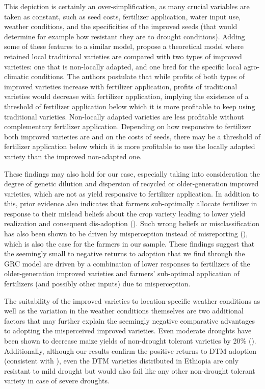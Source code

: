 \documentclass[11pt]{article}
\begin{document}
This depiction is certainly an over-simplification, as many crucial variables are taken as constant, such as seed costs, fertilizer application, water input use, weather conditions, and the specificities of the improved seeds (that would determine for example how resistant they are to drought conditions). Adding some of these features to a similar model, \cite{Bird2020-nt} propose a theoretical model where retained local traditional varieties are compared with two types of improved varieties: one that is non-locally adapted, and one bred for the specific local agro-climatic conditions. The authors postulate that while profits of both types of improved varieties increase with fertilizer application, profits of traditional varieties would decrease with fertilizer application, implying the existence of a threshold of fertilizer application below which it is more profitable to keep using traditional varieties. Non-locally adapted varieties are less profitable without complementary fertilizer application. Depending on how responsive to fertilizer both improved varieties are and on the costs of seeds, there may be a threshold of fertilizer application below which it is more profitable to use the locally adapted variety than the improved non-adapted one.

These findings may also hold for our case, especially taking into consideration the degree of genetic dilution and dispersion of recycled or older-generation improved varieties, which are not as yield responsive to fertilizer application. In addition to this, prior evidence also indicates that farmers sub-optimally allocate fertilizer in response to their mislead beliefs about the crop variety leading to lower yield realization and consequent dis-adoption  (\citealt{euler2022because}). Such wrong beliefs or misclassification has also been shown to be driven by misperception instead of misreporting (\citealt{wossen2022misperceiving}), which is also the case for the farmers in our sample. These findings suggest that the seemingly small to negative returns to adoption that we find through the GRC model are driven by a combination of lower responses to fertilizers of the older-generation improved varieties and farmers’ sub-optimal application of fertilizers (and possibly other inputs) due to misperception.

The suitability of the improved varieties to location-specific weather conditions as well as the variation in the weather conditions themselves are two additional factors that may further explain the seemingly negative comparative advantages to adopting the misperceived improved varieties. Even moderate droughts have been shown to decrease maize yields of non-drought tolerant varieties by 20\% (\citealt{paul2021heterogeneous}). Additionally, although our results confirm the positive returns to DTM adoption (consistent with \citealt{wossen2017measuring}), even the DTM varieties distributed in Ethiopia are only resistant to mild drought but would also fail like any other non-drought tolerant variety in case of severe droughts. 
\end{document}
